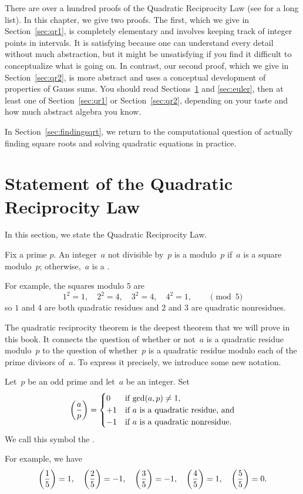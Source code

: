 There are over a hundred proofs of the Quadratic Reciprocity Law (see
\cite{qrlist} for a long list).  In this chapter, we give two proofs.
The first, which we give in Section~\ref{sec:qr1}, is completely
elementary and involves keeping track of integer points in intervals.
It is satisfying because one can understand every detail without much
abstraction, but it might be unsatisfying if you find it difficult to
conceptualize what is going on.  In contrast, our second proof, which
we give in Section~\ref{sec:qr2}, is more abstract and uses a
conceptual development of properties of Gauss sums.  You should read
Sections~\ref{sec:statement} and \ref{sec:euler}, then at least one of
Section~\ref{sec:qr1} or Section~\ref{sec:qr2}, depending on your
taste and how much abstract algebra you know.

In Section~\ref{sec:findingsqrt}, we return to the computational
question of actually finding square roots and solving quadratic
equations in practice.


\section{Statement of the Quadratic Reciprocity Law}\label{sec:statement}
In this section, we state the Quadratic Reciprocity Law.

\begin{definition}
Fix a prime $p$.  An integer~$a$ not divisible by~$p$ is a
 modulo~$p$ if~$a$ is a square modulo~$p$;
otherwise,~$a$ is a .
\end{definition}
For example, the squares modulo $5$ are
$$
  1^2 = 1, \quad 2^2 = 4, \quad 3^2 = 4, \quad 4^2 = 1, \qquad\pmod{5}
$$
so $1$ and $4$ are both quadratic residues and $2$
and $3$ are quadratic nonresidues.

The quadratic reciprocity theorem is the deepest theorem that we
will prove in this book. It connects the question of whether or
not~$a$ is a quadratic residue modulo~$p$ to the question of
whether~$p$ is a quadratic residue modulo each of the prime divisors
of~$a$.  To express it precisely, we introduce some new notation.
\begin{definition}
Let~$p$ be an odd prime and let~$a$ be an integer.
Set
$$
\left(\frac{a}{p}\right) =
\begin{cases}
         0 & \text{if $\gcd(a,p) \neq 1$},\\
        +1 & \text{if $a$ is a quadratic residue, and}\\
        -1 & \text{if $a$ is a quadratic nonresidue}.
\end{cases}
$$
We call this symbol the .
\end{definition}
For example, we have
$$
\left(\frac{1}{5}\right) = 1,\quad
\left(\frac{2}{5}\right) = -1,\quad
\left(\frac{3}{5}\right) = -1,\quad
\left(\frac{4}{5}\right) = 1,\quad
\left(\frac{5}{5}\right) = 0.
$$

